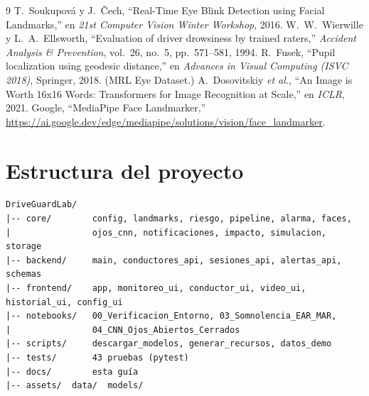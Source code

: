 \documentclass[11pt,a4paper]{article}
\begin{document}
\begin{thebibliography}{9}
 T.~Soukupová y J.~Čech, ``Real-Time Eye Blink Detection using Facial Landmarks,''
  en \emph{21st Computer Vision Winter Workshop}, 2016.
 W.~W.~Wierwille y L.~A.~Ellsworth, ``Evaluation of driver drowsiness by trained
  raters,'' \emph{Accident Analysis \& Prevention}, vol.~26, no.~5, pp.~571--581, 1994.
 R.~Fusek, ``Pupil localization using geodesic distance,'' en \emph{Advances in Visual
  Computing (ISVC 2018)}, Springer, 2018. (MRL Eye Dataset.)
 A.~Dosovitskiy \emph{et al.}, ``An Image is Worth 16x16 Words: Transformers for
  Image Recognition at Scale,'' en \emph{ICLR}, 2021.
 Google, ``MediaPipe Face Landmarker,''
  \url{https://ai.google.dev/edge/mediapipe/solutions/vision/face_landmarker}.
\end{thebibliography}

\appendix
\section{Estructura del proyecto}
\begin{lstlisting}
DriveGuardLab/
|-- core/        config, landmarks, riesgo, pipeline, alarma, faces,
|                ojos_cnn, notificaciones, impacto, simulacion, storage
|-- backend/     main, conductores_api, sesiones_api, alertas_api, schemas
|-- frontend/    app, monitoreo_ui, conductor_ui, video_ui, historial_ui, config_ui
|-- notebooks/   00_Verificacion_Entorno, 03_Somnolencia_EAR_MAR,
|                04_CNN_Ojos_Abiertos_Cerrados
|-- scripts/     descargar_modelos, generar_recursos, datos_demo
|-- tests/       43 pruebas (pytest)
|-- docs/        esta guía
|-- assets/  data/  models/
\end{lstlisting}
\end{document}
